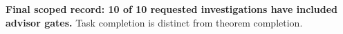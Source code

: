 \begin{center}\small\textbf{Final scoped record: 10 of 10 requested investigations have included advisor gates.} Task completion is distinct from theorem completion.\end{center}
